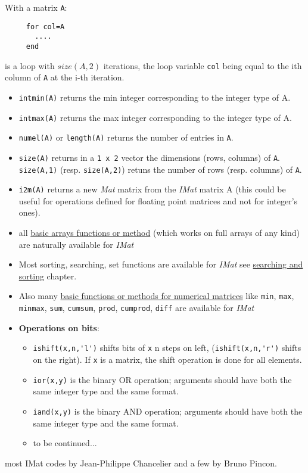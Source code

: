 
With a matrix \verb+A+:
\begin{verbatim}
     for col=A
       ....
     end
\end{verbatim} 
is a loop with $size(A,2)$ iterations, the loop 
variable  \verb+col+ being equal to the ith column of \verb+A+ at the i-th iteration.

\begin{itemize}
   \item \verb+intmin(A)+ returns the min integer corresponding to the integer type of A.
   \item \verb+intmax(A)+ returns the max integer corresponding to the integer type of A.
   \item \verb+numel(A)+ or \verb+length(A)+ returns the number of entries in \verb+A+.
   \item \verb+size(A)+ returns in a \verb+1 x 2+ vector the dimensions (rows, columns)
of \verb+A+. \verb+size(A,1)+ (resp. \verb+size(A,2)+) retuns the number of rows 
(resp. columns) of \verb+A+.
   \item \verb+i2m(A)+ returns a new \emph{Mat} matrix from the \emph{IMat} matrix A (this could be useful for
    operations defined for floating point matrices and not for integer's ones).  
   \item all \hyperlink{arrays}{basic arrays functions or method} (which works on full arrays of any kind) 
     are naturally available for \emph{IMat} 
    \item Most sorting, searching, set functions are available for \emph{IMat} see \hyperlink{searchandsort}{searching
      and sorting} chapter.
   \item Also many \hyperlink{basicnumarrays}{basic functions or methods for numerical matrices} like \verb+min+, 
      \verb+max+, \verb+minmax+, \verb+sum+, \verb+cumsum+, \verb+prod+,  \verb+cumprod+, \verb+diff+ are available
       for \emph{IMat}
   \item {\bf Operations on bits}: 
   \begin{itemize}
   \item \verb+ishift(x,n,'l')+ shifts bits of \verb+x+ n steps on left, (\verb+ishift(x,n,'r')+ shifts on the right).
          If \verb+x+ is a matrix, the shift operation is done for all elements.
   \item \verb+ior(x,y)+ is the binary OR operation; arguments should have both the same integer type
         and the same format.
   \item \verb+iand(x,y)+ is the binary AND operation; arguments should have both the same integer type
         and the same format. 
   \item to be continued...
   \end{itemize}
\end{itemize}


\begin{authors}
   most IMat codes by Jean-Philippe Chancelier and a few by Bruno Pincon.
\end{authors}
